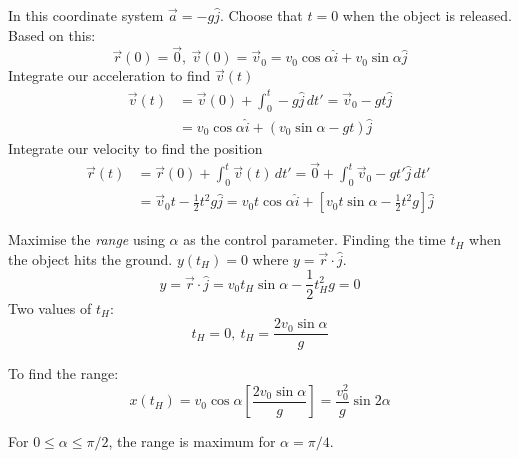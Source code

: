\begin{example}[Projectile]
\begin{center}
\begin{tikzpicture}
\end{tikzpicture}
	\end{center}
	
	In this coordinate system $\vec{a} = -g\hat{j}$. Choose that $t = 0$ when the object is released. Based on this: \[\vec{r}(0) = \vec{0},~\vec{v}(0) = \vec{v}_0 = v_0\cos\alpha\hat{i} + v_0\sin\alpha\hat{j}\]
	Integrate our acceleration to find $\vec{v}(t)$
	\[\begin{aligned}\vec{v}(t) &= \vec{v}(0) + \int_0^t -g\hat{j}\,dt' = \vec{v}_0 -gt\hat{j} \\ 
	&= v_0\cos\alpha\hat{i} + (v_0\sin\alpha -gt)\hat{j}
\end{aligned}
\]
	Integrate our velocity to find the position
	\[\begin{aligned}
\vec{r}(t) &= \vec{r}(0) + 	\int_0^t \vec{v}(t)\,dt' = \vec{0} + \int_0^t\vec{v}_0 -gt'\hat{j}\,dt'\\
&= \vec{v}_0t - \textstyle{\frac{1}{2}}t^2g\hat{j} = v_0t\cos\alpha\hat{i} + [v_0t\sin\alpha - \textstyle{\frac{1}{2}}t^2g]\hat{j}
\end{aligned}
\]

Maximise the \emph{range} using $\alpha$ as the control parameter. Finding the time $t_H$ when the object hits the ground. $y(t_H) = 0$ where $y = \vec{r}\cdot\hat{j}$. 
\[y = \vec{r}\cdot\hat{j}= v_0t_H\sin\alpha -\textstyle{\frac{1}{2}}t_H^2g = 0\]
Two values of $t_H$:
\[t_H = 0,~ t_H = \frac{2v_0\sin\alpha}{g}\]

To find the range:
\[x(t_H) = v_0\cos\alpha\left[\frac{2v_0\sin\alpha}{g}\right] = \frac{v_0^2}{g}\sin 2\alpha\]

For $0 \leq \alpha \leq \pi/2$, the range is maximum for $\alpha = \pi/4$.
\end{example}~

